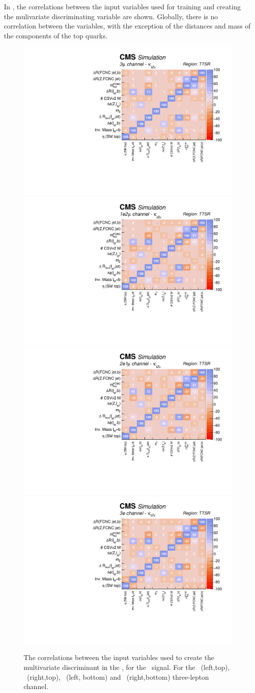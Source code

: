 \newpage
In , the correlations between the input variables used for training and creating the mulivariate discriminating variable are shown. Globally, there is no correlation between the variables, with the exception of the distances and mass of the components of the top quarks. 
\begin{figure}[htbp]
	\centering
	\includegraphics[width=0.49\linewidth]{6_Search/Figures/PlotsTechnics/correlationsigZuttoppairuuu}
	\includegraphics[width=0.49\linewidth]{6_Search/Figures/PlotsTechnics/correlationsigZuttoppairuue}
	\includegraphics[width=0.49\linewidth]{6_Search/Figures/PlotsTechnics/correlationsigZuttoppaireeu}
	\includegraphics[width=0.49\linewidth]{6_Search/Figures/PlotsTechnics/correlationsigZuttoppaireee}
	\caption{The correlations between the input variables used to create the multivariate discriminant in the \TTSR, for the \Zut\ signal. For the \mumumu\ (left,top), \emumu\ (right,top), \eemu\ (left, bottom) and \eee\ (right,bottom) three-lepton channel.}
	\label{fig:correlationsigzuttoppair}
\end{figure}

